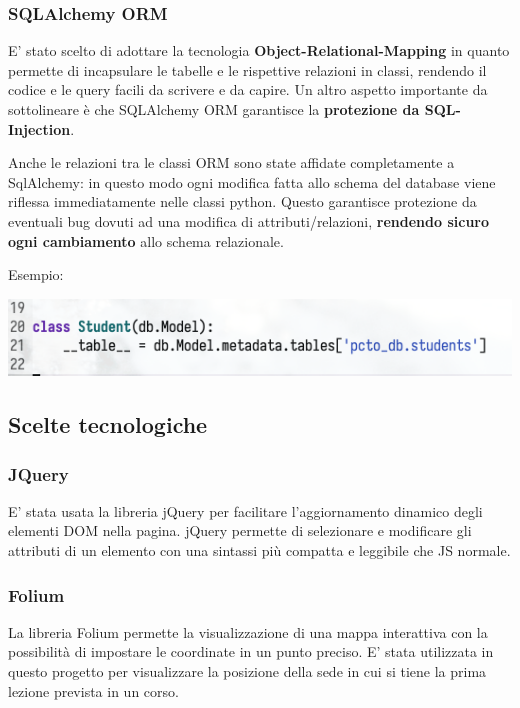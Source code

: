\documentclass[11pt]{article}
\begin{document}
\subsubsection{SQLAlchemy ORM}
\label{sec:orga97e670}

E' stato scelto di adottare la tecnologia \textbf{Object-Relational-Mapping} in quanto permette di incapsulare le tabelle e le rispettive relazioni in classi, rendendo il codice e le query facili da scrivere e da capire. Un altro aspetto importante da sottolineare è che SQLAlchemy ORM garantisce la \textbf{protezione da SQL-Injection}.

Anche le relazioni tra le classi ORM sono state affidate completamente a SqlAlchemy: in questo modo ogni modifica fatta allo schema del database viene riflessa immediatamente nelle classi python. Questo garantisce protezione da eventuali bug dovuti ad una modifica di attributi/relazioni, \textbf{rendendo sicuro ogni cambiamento} allo schema relazionale.

Esempio:

\begin{center}
\includegraphics[width=.9\linewidth]{./resources/orm.png}
\end{center}

\subsection{Scelte tecnologiche}
\label{sec:org5a20418}

\subsubsection{JQuery}
\label{sec:orgf03e02b}
E' stata usata la libreria jQuery per facilitare l'aggiornamento dinamico degli elementi DOM nella pagina. jQuery permette di selezionare e modificare gli attributi di un elemento con una sintassi più compatta e leggibile che JS normale.

\subsubsection{Folium}
\label{sec:org4fec31d}
La libreria Folium permette la visualizzazione di una mappa interattiva con la possibilità di impostare le coordinate in un punto preciso. E' stata utilizzata in questo progetto per visualizzare la posizione della sede in cui si tiene la prima lezione prevista in un corso.
\end{document}
